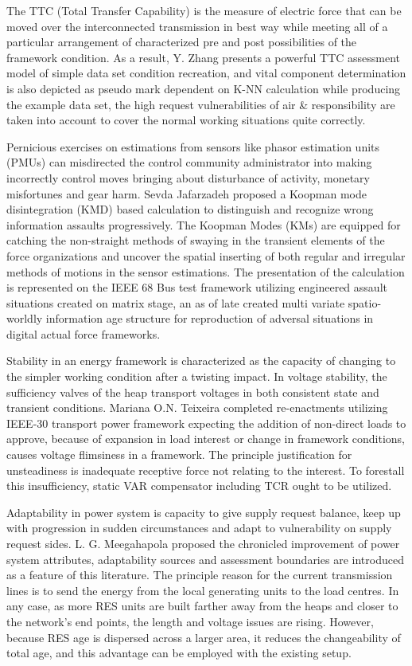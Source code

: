 The TTC (Total Transfer Capability) is the measure of electric force that can be moved over the interconnected transmission in best way while meeting all of a particular arrangement of characterized pre and post possibilities of the framework condition. As a result, Y. Zhang \cite{L6} presents a powerful TTC assessment model of simple data set condition recreation, and vital component determination is also depicted as pseudo mark dependent on K-NN calculation while producing the example data set, the high request vulnerabilities of air \& responsibility are taken into account to cover the normal working situations quite correctly. 

Pernicious exercises on estimations from sensors like phasor estimation units (PMUs) can misdirected the control community administrator into making incorrectly control moves bringing about disturbance of activity, monetary misfortunes and gear harm. Sevda Jafarzadeh \cite{L7} proposed a Koopman mode disintegration (KMD) based calculation to distinguish and recognize wrong information assaults progressively. The Koopman Modes (KMs) are equipped for catching the non-straight methods of swaying in the transient elements of the force organizations and uncover the spatial inserting of both regular and irregular methods of motions in the sensor estimations. The presentation of the calculation is represented on the IEEE 68 Bus test framework utilizing engineered assault situations created on matrix stage, an as of late created multi variate spatio-worldly information age structure for reproduction of adversal situations in digital actual force frameworks. 

Stability in an energy framework is characterized as the capacity of changing to the simpler working condition after a twisting impact. In voltage stability, the sufficiency valves of the heap transport voltages in both consistent state and transient conditions. Mariana O.N. Teixeira \cite{L8} completed re-enactments utilizing IEEE-30 transport power framework expecting the addition of non-direct loads to approve, because of expansion in load interest or change in framework conditions, causes voltage flimsiness in a framework. The principle justification for unsteadiness is inadequate receptive force not relating to the interest. To forestall this insufficiency, static VAR compensator including TCR ought to be utilized.

Adaptability in power system is capacity to give supply request balance, keep up with progression in sudden circumstances and adapt to vulnerability on supply request sides. L. G. Meegahapola \cite{L9} proposed the chronicled improvement of power system attributes, adaptability sources and assessment boundaries are introduced as a feature of this literature. The principle reason for the current transmission lines is to send the energy from the local generating units to the load centres. In any case, as more RES units are built farther away from the heaps and closer to the network's end points, the length and voltage issues are rising. However, because RES age is dispersed across a larger area, it reduces the changeability of total age, and this advantage can be employed with the existing setup.

